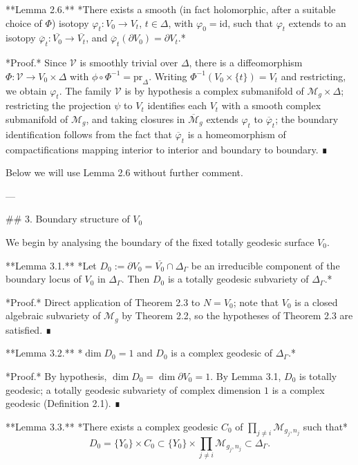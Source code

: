 **Lemma 2.6.** *There exists a smooth (in fact holomorphic, after a suitable choice of $\Phi$) isotopy $\varphi_t : V_0 \to V_t$, $t \in \Delta$, with $\varphi_0 = \mathrm{id}$, such that $\varphi_t$ extends to an isotopy $\overline{\varphi}_t : \overline{V_0} \to \overline{V_t}$, and $\overline{\varphi}_t(\partial V_0) = \partial V_t$.*

*Proof.* Since $\mathcal{V}$ is smoothly trivial over $\Delta$, there is a diffeomorphism $\Phi : \mathcal{V} \to V_0 \times \Delta$ with $\phi \circ \Phi^{-1}=\mathrm{pr}_\Delta$. Writing $\Phi^{-1}(V_0 \times \{t\}) = V_t$ and restricting, we obtain $\varphi_t$. The family $\mathcal{V}$ is by hypothesis a complex submanifold of $\mathcal{M}_g \times \Delta$; restricting the projection $\psi$ to $V_t$ identifies each $V_t$ with a smooth complex submanifold of $\mathcal{M}_g$, and taking closures in $\overline{\mathcal{M}}_g$ extends $\varphi_t$ to $\overline{\varphi}_t$; the boundary identification follows from the fact that $\overline{\varphi}_t$ is a homeomorphism of compactifications mapping interior to interior and boundary to boundary. ∎

Below we will use Lemma 2.6 without further comment.

---

## 3. Boundary structure of $V_0$

We begin by analysing the boundary of the fixed totally geodesic surface $V_0$.

**Lemma 3.1.** *Let $D_0 := \partial V_0 = \overline{V_0} \cap \Delta_\Gamma$ be an irreducible component of the boundary locus of $V_0$ in $\Delta_\Gamma$. Then $D_0$ is a totally geodesic subvariety of $\Delta_\Gamma$.*

*Proof.* Direct application of Theorem 2.3 to $N = V_0$; note that $V_0$ is a closed algebraic subvariety of $\mathcal{M}_g$ by Theorem 2.2, so the hypotheses of Theorem 2.3 are satisfied. ∎

**Lemma 3.2.** *$\dim D_0 = 1$ and $D_0$ is a complex geodesic of $\Delta_\Gamma$.*

*Proof.* By hypothesis, $\dim D_0 = \dim \partial V_0 = 1$. By Lemma 3.1, $D_0$ is totally geodesic; a totally geodesic subvariety of complex dimension $1$ is a complex geodesic (Definition 2.1). ∎

**Lemma 3.3.** *There exists a complex geodesic $C_0$ of $\prod_{j \neq i} \mathcal{M}_{g_j, n_j}$ such that*
$$D_0 = \{Y_0\} \times C_0 \subset \{Y_0\} \times \prod_{j \neq i} \mathcal{M}_{g_j, n_j} \subset \Delta_\Gamma.$$


